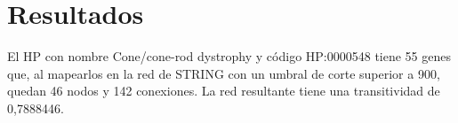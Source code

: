 
\section{Resultados}
El HP con nombre Cone/cone-rod dystrophy y código HP:0000548 tiene 55 genes que, al mapearlos en la red de STRING \cite{Szklarczyk2023} con un umbral de corte superior a 900, quedan 46 nodos y 142 conexiones. La red resultante tiene una transitividad de 0,7888446.